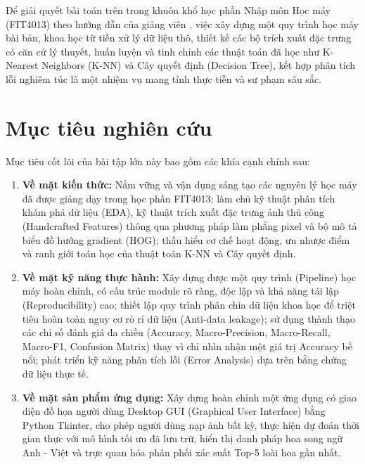 \documentclass[../DoAn.tex]{subfiles}
\begin{document}
Để giải quyết bài toán trên trong khuôn khổ học phần Nhập môn Học máy (FIT4013) theo hướng dẫn của giảng viên \cite{lethithuytrang2026huongdan, lethithuytrang2026baigiang}, việc xây dựng một quy trình học máy bài bản, khoa học từ tiền xử lý dữ liệu thô, thiết kế các bộ trích xuất đặc trưng có căn cứ lý thuyết, huấn luyện và tinh chỉnh các thuật toán đã học như K-Nearest Neighbors (K-NN) và Cây quyết định (Decision Tree), kết hợp phân tích lỗi nghiêm túc là một nhiệm vụ mang tính thực tiễn và sư phạm sâu sắc.

\section{Mục tiêu nghiên cứu}
Mục tiêu cốt lõi của bài tập lớn này bao gồm các khía cạnh chính sau:
\begin{enumerate}
    \item \textbf{Về mặt kiến thức:} Nắm vững và vận dụng sáng tạo các nguyên lý học máy đã được giảng dạy trong học phần FIT4013; làm chủ kỹ thuật phân tích khám phá dữ liệu (EDA), kỹ thuật trích xuất đặc trưng ảnh thủ công (Handcrafted Features) thông qua phương pháp làm phẳng pixel và bộ mô tả biểu đồ hướng gradient (HOG); thấu hiểu cơ chế hoạt động, ưu nhược điểm và ranh giới toán học của thuật toán K-NN và Cây quyết định.
    \item \textbf{Về mặt kỹ năng thực hành:} Xây dựng được một quy trình (Pipeline) học máy hoàn chỉnh, có cấu trúc module rõ ràng, độc lập và khả năng tái lập (Reproducibility) cao; thiết lập quy trình phân chia dữ liệu khoa học để triệt tiêu hoàn toàn nguy cơ rò rỉ dữ liệu (Anti-data leakage); sử dụng thành thạo các chỉ số đánh giá đa chiều (Accuracy, Macro-Precision, Macro-Recall, Macro-F1, Confusion Matrix) thay vì chỉ nhìn nhận một giá trị Accuracy bề nổi; phát triển kỹ năng phân tích lỗi (Error Analysis) dựa trên bằng chứng dữ liệu thực tế.
    \item \textbf{Về mặt sản phẩm ứng dụng:} Xây dựng hoàn chỉnh một ứng dụng có giao diện đồ họa người dùng Desktop GUI (Graphical User Interface) bằng Python Tkinter, cho phép người dùng nạp ảnh bất kỳ, thực hiện dự đoán thời gian thực với mô hình tối ưu đã lưu trữ, hiển thị danh pháp hoa song ngữ Anh - Việt và trực quan hóa phân phối xác suất Top-5 loài hoa gần nhất.
\end{enumerate}
\end{document}
